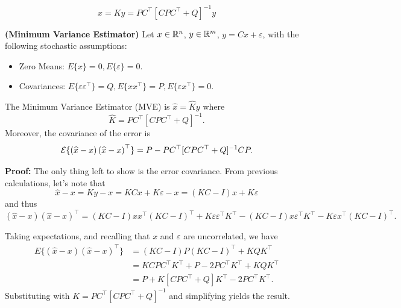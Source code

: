 $$\boxed{\widehat{x} = K y =  PC^\top [CPC^\top +Q]^{-1}y}$$

\begin{thm} \textbf{(Minimum Variance Estimator)}
\label{thm:MVE}
     Let $x\in\mathbb R^n$, $y\in\mathbb R^m$, $y=Cx+\varepsilon$,  with the following stochastic assumptions:
 \begin{itemize}
     \item Zero Means: $E\{x\}=0, E\{\varepsilon\}= 0$. 
     \item Covariances: $E\{\varepsilon \varepsilon^\top \}=Q, E\{xx^\top \}= P, E\{\varepsilon x^\top \}=0$.
 \end{itemize} 
The Minimum Variance Estimator (MVE) is $\widehat{x}=\widehat{K}y$ where
    \begin{equation*}
        \widehat{K}=PC^\top [CPC^\top +Q]^{-1}.
    \end{equation*}
    Moreover, the covariance of the error is
    \begin{equation*}
        \mathcal{E}\{\left(\widehat{x}-x\right)\left(\widehat{x}-x\right)^\top\}=P-PC^\top [CPC^\top +Q]^{-1}CP.
    \end{equation*}

\end{thm}

\textbf{Proof:} The only thing left to show is the error covariance. From previous calculations,  let's note that
$$\widehat x -x = Ky-x = KC x + K \varepsilon  - x=(KC - I)x + K \varepsilon $$
and thus
$$ (\widehat x -x)(\widehat x -x)^\top= (KC - I)x x^\top (KC - I)^\top + K \varepsilon \varepsilon^\top K^\top - (KC - I)x \varepsilon^\top K^\top - K\varepsilon x^\top (KC - I)^\top.  $$

Taking expectations, and recalling that $x$ and $\varepsilon$ are uncorrelated, we have
\begin{align*}
E\{(\widehat x -x)(\widehat x -x)^\top \} & = (KC-I) P (KC-I)^\top + K Q K^\top \\
&= KC P C^\top K^\top + P - 2 PC^\top K^\top + K Q K^\top\\
&= P + K [CPC^\top + Q] K^\top  -2 PC^\top K^\top.
\end{align*}
Substituting with $K=PC^\top [CPC^\top +Q]^{-1}$ and simplifying yields the result.
\Qed

\newpage

